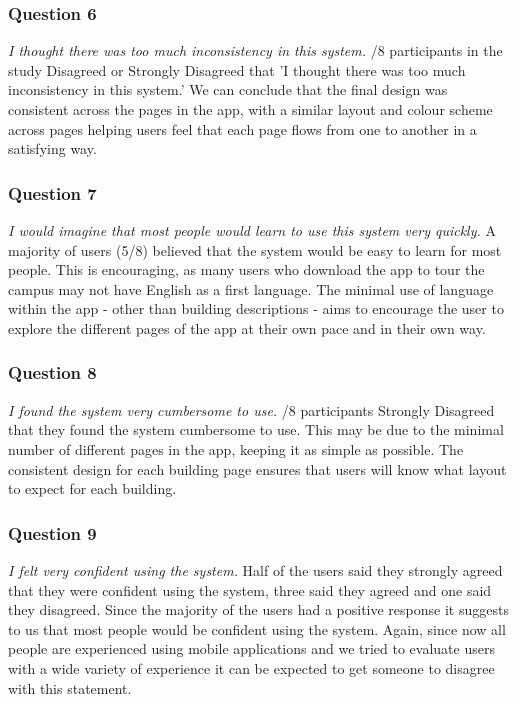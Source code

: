 \documentclass[a4,10pt,twocolumn]{article}
\begin{document}
\subsubsection{Question 6}
\noindent\emph{I thought there was too much inconsistency in this system.}
\newline
{}/8 participants in the study Disagreed or Strongly Disagreed that 'I thought there was too much inconsistency in this system.' We can conclude that the final design was consistent across the pages in the app, with a similar layout and colour scheme across pages helping users feel that each page flows from one to another in a satisfying way. 

\subsubsection{Question 7}
\noindent\emph{I would imagine that most people would learn to use this system very quickly.}
\newline
\newline
A majority of users (5/8) believed that the system would be easy to learn for most people. This is encouraging, as many users who download the app to tour the campus may not have English as a first language. The minimal use of language within the app - other than building descriptions - aims to encourage the user to explore the different pages of the app at their own pace and in their own way. 

\subsubsection{Question 8}
\noindent\emph{I found the system very cumbersome to use.}
\newline
{}/8 participants Strongly Disagreed that they found the system cumbersome to use. This may be due to the minimal number of different pages in the app, keeping it as simple as possible. The consistent design for each building page ensures that users will know what layout to expect for each building. 

\subsubsection{Question 9}
\noindent\emph{I felt very confident using the system.}
\newline
\newline
Half of the users said they strongly agreed that they were confident using the system, three said they agreed and one said they disagreed. Since the majority of the users had a positive response it suggests to us that most people would be confident using the system. Again, since now all people are experienced using mobile applications and we tried to evaluate users with a wide variety of experience it can be expected to get someone to disagree with this statement.
\end{document}
